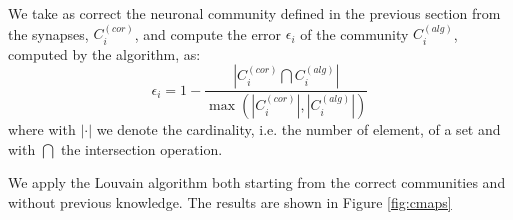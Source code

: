 We take as correct the neuronal community defined in the previous section from the synapses,
$C_i^{(cor)}$, and compute the error $\epsilon_i$ of the community $C_i^{(alg)}$, computed by
the algorithm, as:
\begin{equation}
    \epsilon_i = 1- \frac{\left|C_i^{(cor)} \bigcap C_i^{(alg)}\right| }{\max{\left(\left|C_i^{(cor)}\right|, \left|C_i^{(alg)}\right|\right)}}
\end{equation}
where with $|\cdot|$ we denote the cardinality, i.e. the number of element, of a set and with $\bigcap$
the intersection operation.

We apply the Louvain algorithm both starting from the correct communities and without previous knowledge.
The results are shown in Figure \ref{fig:cmaps}